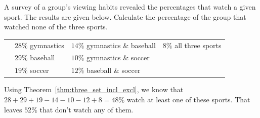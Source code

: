 \newpage

\begin{exer}
A survey of a group's viewing habits revealed 
the percentages that watch a given sport.  The results are given below.
Calculate the percentage of the group that watched none of the three sports.

\begin{tabular}{p{.25in}lll}
&$28\%$  gymnastics & $14\%$  gymnastics \& baseball&  $8\%$  all three sports\\
&$29\%$  baseball& 		$10\%$  gymnastics \& soccer\\
&$19\%$  soccer & 		$12\%$  baseball \& soccer 
\end{tabular}

\vspace*{3.25in}
\begin{answer}
Using Theorem~\ref{thm:three_set_incl_excl}, we know that
$28+29+19-14-10-12+8=48\%$  watch at least one of these sports.  
That leaves $52\%$ that don't watch any of them.
\end{answer}
\end{exer}

%
%


